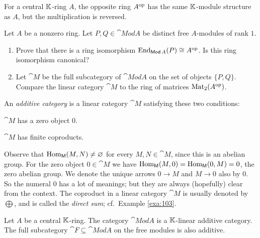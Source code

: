 For a central $\mathbb{K}$-ring $A$, the opposite ring $A^{\mathrm{op}}$ has the same 
$\mathbb{K}$-module structure as $A$, but the multiplication is reversed. 

\begin{exer} \label{exer:1030}
Let $A$ be a nonzero ring. Let $P, Q \in \cat{Mod} A$ 
be distinct free $A$-modules of rank $1$.
\begin{enumerate}
\item Prove that there is a ring isomorphism 
$\operatorname{End}_{\operatorname{\mathsf{Mod}} A}(P) \cong A^{\mathrm{op}}$.
Is this ring isomorphism canonical?

\item Let $\cat{M}$ be the full subcategory of $\cat{Mod} A$ on the set of 
objects $\{ P, Q \}$. Compare the linear category $\cat{M}$ to the ring of 
matrices $\operatorname{Mat}_2(A^{\mathrm{op}})$.
\end{enumerate}
\end{exer}
 



\begin{dfn} 
An  {\em additive category}%
is a linear category $\cat{M}$
satisfying these two conditions:
\begin{enumerate}
 $\cat{M}$ has a zero object $0$.

 $\cat{M}$ has finite coproducts.
\end{enumerate}
\end{dfn}

Observe that $\operatorname{Hom}_{\operatorname{\mathsf{M}}}(M, N) \neq \varnothing$
for every $M, N \in \cat{M}$, since this is an abelian group. For the zero 
object $0 \in \cat{M}$ we have 
$\operatorname{Hom}_{\operatorname{\mathsf{M}}}(M, 0) = \operatorname{Hom}_{\operatorname{\mathsf{M}}}(0, M) = 0$, 
the zero abelian group.  We denote the unique arrows $0 \to M$ and 
$M \to 0$ also by $0$. So the numeral $0$ has a lot of meanings; but they are 
always (hopefully) clear from the context. 
The coproduct in a linear category $\cat{M}$ is usually denoted by $\bigoplus$, 
and is called the {\em direct sum}; cf.\ Example \ref{exa:103}.

\begin{exa}
Let $A$ be a central $\mathbb{K}$-ring. The category $\cat{Mod} A$ is a $\mathbb{K}$-linear 
additive category. 
The full subcategory $\cat{F} \subseteq \cat{Mod} A$ on the free modules is
also additive. 
\end{exa}

